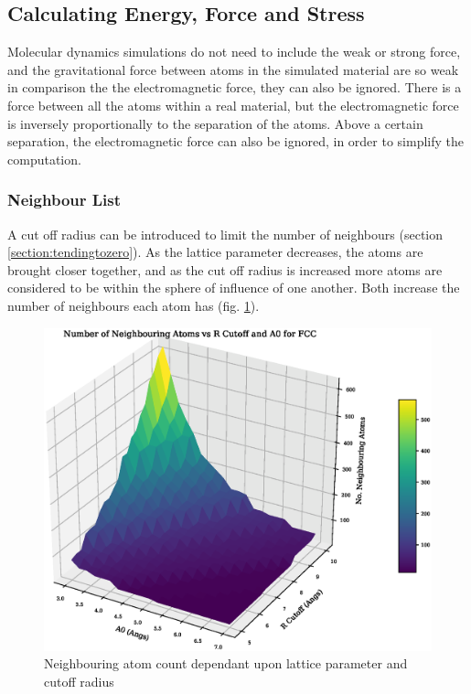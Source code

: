 \FloatBarrier
\subsection{Calculating Energy, Force and Stress}
\label{section:backgroundenergyforcestress}

Molecular dynamics simulations do not need to include the weak or strong force, and the gravitational force between atoms in the simulated material are so weak in comparison the the electromagnetic force, they can also be ignored.  There is a force between all the atoms within a real material, but the electromagnetic force is inversely proportionally to the separation of the atoms.  Above a certain separation, the electromagnetic force can also be ignored, in order to simplify the computation.

\FloatBarrier
\subsubsection{Neighbour List}
\label{section:neighbourlist}

A cut off radius can be introduced to limit the number of neighbours (section \ref{section:tendingtozero}).  As the lattice parameter decreases, the atoms are brought closer together, and as the cut off radius is increased more atoms are considered to be within the sphere of influence of one another.  Both increase the number of neighbours each atom has (fig. \ref{fig:nlsize}).

\begin{figure}[tbp]
  \begin{center}
    \includegraphics[scale=0.40]{chapters/background_potential_fitting/plots/atom_neighbours.eps}
    \caption{Neighbouring atom count dependant upon lattice parameter and cutoff radius}
    \label{fig:nlsize}
  \end{center}
\end{figure}

